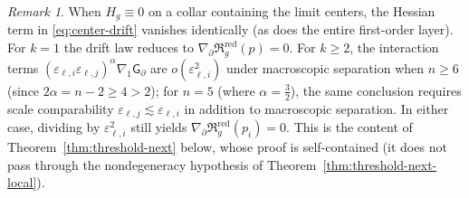 \documentclass[11pt,reqno,a4paper]{amsart}
\numberwithin{equation}{section}
\theoremstyle{plain}
\theoremstyle{remark}
\newtheorem{remark}[theorem]{Remark}
\theoremstyle{plain}
\begin{document}
\begin{remark}
When $H_g\equiv0$ on a collar containing the limit centers, the Hessian term in \eqref{eq:center-drift}
vanishes identically (as does the entire first-order layer).
For $k=1$ the drift law reduces to $\nabla_\partial\mathfrak R_g^{\mathrm{red}}(p)=0$.
For $k\ge2$, the interaction terms $(\varepsilon_{\ell,i}\varepsilon_{\ell,j})^\alpha\nabla_1\mathsf G_\partial$
are $o(\varepsilon_{\ell,i}^2)$ under macroscopic separation when $n\ge6$ (since $2\alpha=n-2\ge4>2$);
for $n=5$ (where $\alpha=\tfrac32$), the same conclusion requires scale comparability
$\varepsilon_{\ell,j}\lesssim\varepsilon_{\ell,i}$ in addition to macroscopic separation.
In either case, dividing by $\varepsilon_{\ell,i}^2$ still yields $\nabla_\partial\mathfrak R_g^{\mathrm{red}}(p_i)=0$.
This is the content of Theorem~\ref{thm:threshold-next} below,
whose proof is self-contained (it does not pass through the nondegeneracy hypothesis of
Theorem~\ref{thm:threshold-next-local}).
\end{remark}
\end{document}
